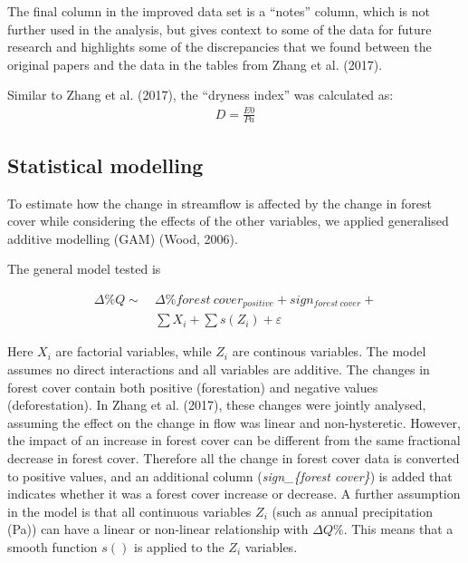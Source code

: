 \documentclass[]{elsarticle} %
\newenvironment{Shaded}{\begin{snugshade}}{\end{snugshade}}
\newcommand{\DataTypeTok}[1]{\textcolor[rgb]{0.13,0.29,0.53}{#1}}
\newcommand{\DecValTok}[1]{\textcolor[rgb]{0.00,0.00,0.81}{#1}}
\newcommand{\KeywordTok}[1]{\textcolor[rgb]{0.13,0.29,0.53}{\textbf{#1}}}
\newcommand{\NormalTok}[1]{#1}
\newcommand{\OperatorTok}[1]{\textcolor[rgb]{0.81,0.36,0.00}{\textbf{#1}}}
\newcommand{\StringTok}[1]{\textcolor[rgb]{0.31,0.60,0.02}{#1}}
\begin{document}
The final column in the improved data set is a ``notes'' column, which
is not further used in the analysis, but gives context to some of the
data for future research and highlights some of the discrepancies that
we found between the original papers and the data in the tables from
Zhang et al. (2017).

Similar to Zhang et al. (2017), the ``dryness index'' was calculated as:
\[\tag{1}
\begin{aligned}
D = \frac{E0}{Pa}
\end{aligned}\]

\hypertarget{statistical-modelling}{%
\subsection{Statistical modelling}\label{statistical-modelling}}

\begin{Shaded}
\end{Shaded}

To estimate how the change in streamflow is affected by the change in
forest cover while considering the effects of the other variables, we
applied generalised additive modelling (GAM) (Wood, 2006).

The general model tested is

\[\tag{2}
\begin{aligned}
\Delta \% Q \sim ~ &\Delta \% forest~cover_{positive} + sign_{forest~cover} + \\ & \sum{X_i} + \sum{s(Z_i)} + \varepsilon
\end{aligned}\]

Here \(X_i\) are factorial variables, while \(Z_i\) are continous
variables. The model assumes no direct interactions and all variables
are additive. The changes in forest cover contain both positive
(forestation) and negative values (deforestation). In Zhang et al.
(2017), these changes were jointly analysed, assuming the effect on the
change in flow was linear and non-hysteretic. However, the impact of an
increase in forest cover can be different from the same fractional
decrease in forest cover. Therefore all the change in forest cover data
is converted to positive values, and an additional column
(\emph{sign\_\{forest cover\}}) is added that indicates whether it was a
forest cover increase or decrease. A further assumption in the model is
that all continuous variables \(Z_i\) (such as annual precipitation
(Pa)) can have a linear or non-linear relationship with \(\Delta Q \%\).
This means that a smooth function \(s()\) is applied to the \(Z_i\)
variables.
\end{document}
